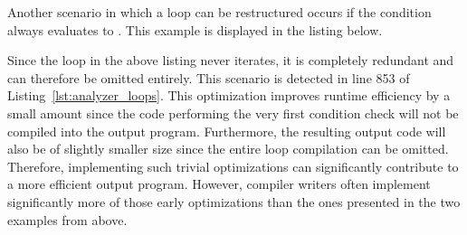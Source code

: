 
Another scenario in which a  loop can be restructured occurs if the condition always evaluates to .
This example is displayed in the listing below.


Since the loop in the above listing never iterates, it is completely redundant and can therefore be omitted entirely.
This scenario is detected in line 853 of Listing~\ref{lst:analyzer_loops}.
This optimization improves runtime efficiency by a small amount since the code performing the very first condition check will not be compiled into the output program.
Furthermore, the resulting output code will also be of slightly smaller size since the entire loop compilation can be omitted.
Therefore, implementing such trivial optimizations can significantly contribute to a more efficient output program.
However, compiler writers often implement significantly more of those early optimizations than the ones presented in the two examples from above.

